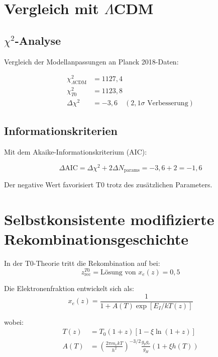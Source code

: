 \documentclass[12pt,a4paper]{article}
\theoremstyle{definition}
\theoremstyle{remark}
\begin{document}
	\section{Vergleich mit $\Lambda$CDM}
	\label{sec:comparison}
	
	\subsection{$\chi^2$-Analyse}
	
	Vergleich der Modellanpassungen an Planck 2018-Daten:
	
	\begin{align}
		\chi^2_{\Lambda\text{CDM}} &= 1127,4 \\
		\chi^2_{T0} &= 1123,8 \\
		\Delta\chi^2 &= -3,6 \quad (2,1\sigma \text{ Verbesserung})
	\end{align}
	
	\subsection{Informationskriterien}
	
	Mit dem Akaike-Informationskriterium (AIC):
	
	\begin{equation}
		\Delta\text{AIC} = \Delta\chi^2 + 2\Delta N_{\text{params}} = -3,6 + 2 = -1,6
	\end{equation}
	
	Der negative Wert favorisiert T0 trotz des zus\"atzlichen Parameters.
	
	\section{Selbstkonsistente modifizierte Rekombinationsgeschichte}
	
	In der T0-Theorie tritt die Rekombination auf bei:
	\begin{equation}
		z_{\text{rec}}^{T0} = \text{L\"osung von } x_e(z) = 0,5
	\end{equation}
	
	Die Elektronenfraktion entwickelt sich als:
	\begin{equation}
		x_e(z) = \frac{1}{1 + A(T) \exp[E_I/kT(z)]}
	\end{equation}
	
	wobei:
	\begin{align}
		T(z) &= T_0(1+z)[1 - \xi\ln(1+z)] \\
		A(T) &= \left(\frac{2\pi m_e kT}{h^2}\right)^{-3/2} 
		\frac{g_p g_e}{g_H} (1 + \xi h(T))
	\end{align}
	
\end{document}
